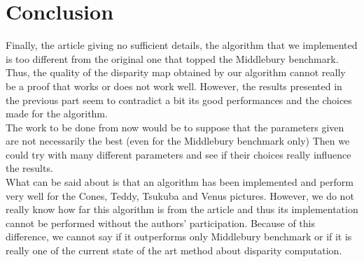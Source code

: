 \documentclass{ipol}
\begin{document}
\newpage

\section{Conclusion}

Finally, the article \cite{adCensus} giving no sufficient details, the algorithm that we implemented is too different from the original one that topped the Middlebury benchmark. Thus, the quality of the disparity map obtained by our algorithm cannot really be a proof that \cite{adCensus} works or does not work well. However, the results presented in the previous part seem to contradict a bit its good performances and the choices made for the algorithm.\\
The work to be done from now would be to suppose that the parameters given  are not necessarily the best (even for the Middlebury benchmark only) Then we could try with many different parameters and see if their choices really influence the results.\\
What can be said about \cite{adCensus} is that an algorithm has been implemented and perform very well for the Cones, Teddy, Tsukuba and Venus pictures. However, we do not really know how far this algorithm is from the article and thus its implementation cannot be performed without the authors' participation. Because of this difference, we cannot say if it outperforms only Middlebury benchmark or if it is really one of the current state of the art method about disparity computation.



\end{document}
